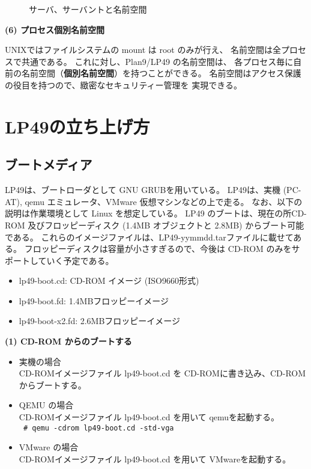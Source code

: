 \begin{figure}[htb]
  \begin{center}
   \epsfxsize=360pt
    \caption{サーバ、サーバントと名前空間}
    \label{fig:NS-server-servant}
  \end{center}
\end{figure}


{\bf\flushleft (6) プロセス個別名前空間}

  UNIXではファイルシステムの mount は root のみが行え、
  名前空間は全プロセスで共通である。
  これに対し、Plan9/LP49 の名前空間は、
  各プロセス毎に自前の名前空間（{\bf 個別名前空間}）を持つことができる。
  名前空間はアクセス保護の役目を持つので、緻密なセキュリティー管理を
  実現できる。


\chapter{LP49の立ち上げ方}
\section{ブートメディア}

     LP49は、ブートローダとして GNU GRUBを用いている。
     LP49は、実機 (PC-AT), qemu エミュレータ、VMware 仮想マシンなどの上で走る。
     なお、以下の説明は作業環境として Linux を想定している。
     LP49 のブートは、現在の所CD-ROM 及びフロッピーディスク (1.4MB オブジェクトと 2.8MB) 
     からブート可能である。
     これらのイメージファイルは、LP49-yymmdd.tarファイルに載せてある。
     フロッピーディスクは容量が小さすぎるので、今後は CD-ROM のみをサポートしていく予定である。
\begin{itemize}
\item     lp49-boot.cd:  CD-ROM イメージ (ISO9660形式)
\item     lp49-boot.fd: 1.4MBフロッピーイメージ
\item     lp49-boot-x2.fd: 2.6MBフロッピーイメージ
\end{itemize}


{\bf (1)  CD-ROM からのブートする}

  \begin{itemize}
       \item  実機の場合\\
          CD-ROMイメージファイル lp49-boot.cd を CD-ROMに書き込み、CD-ROMからブートする。
       \item  QEMU の場合 \\
          CD-ROMイメージファイル lp49-boot.cd を用いて qemuを起動する。\\
            \verb| # qemu -cdrom lp49-boot.cd -std-vga |  
       \item  VMware の場合 \\
          CD-ROMイメージファイル lp49-boot.cd を用いて VMwareを起動する。
  \end{itemize}

